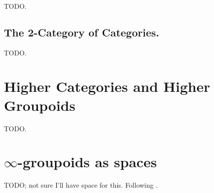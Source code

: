 \documentclass[11 pt]{amsart}
\theoremstyle{plain}   %
\theoremstyle{definition}
\theoremstyle{remark}
\numberwithin{equation}{section}
\begin{document}
TODO.

\subsection{The 2-Category of Categories.}\label{1cat}

TODO.

\section{Higher Categories and Higher Groupoids}\label{higher categories}

TODO.

\section{$\infty$-groupoids as spaces}\label{infinity groupoids}

TODO; not sure I'll have space for this. Following \cite{Porter}.



\end{document}

